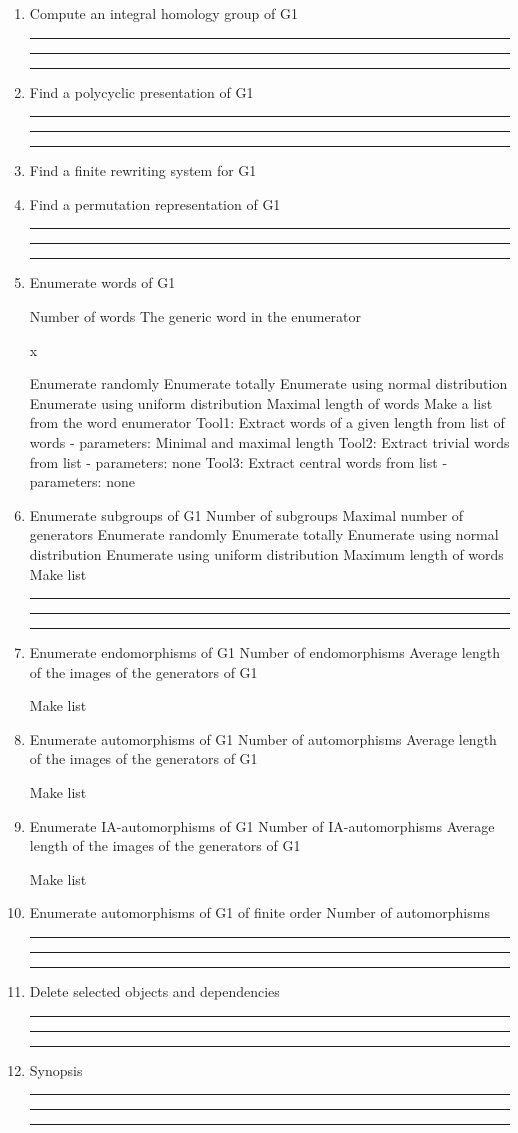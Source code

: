 \begin{enumerate}
\item Compute an integral homology group of G1

\bigskip
\hrule\hrule\hrule

\item Find a polycyclic presentation of G1

\bigskip
\hrule\hrule\hrule

\item Find a finite rewriting system for G1

\item Find a permutation representation of G1

\bigskip
\hrule\hrule\hrule
\item Enumerate words of G1

\subitem Number of words
\subsubitem The generic word in the enumerator

\hskip 2.0in    x

\subsubitem Enumerate randomly
\subsubitem Enumerate totally
\subsubitem Enumerate using normal distribution
\subsubitem Enumerate using uniform distribution
\subsubitem Maximal length of words
\bigskip
\subitem Make a list from the word enumerator
\subsubitem Tool1: Extract words of a given length
from list of words - parameters: Minimal and maximal length
\subsubitem Tool2: Extract trivial words from list - parameters: none
\subsubitem Tool3: Extract central words from list - parameters: none
\bigskip
\item Enumerate subgroups of G1
\subitem Number of subgroups
\subitem Maximal number of generators
\subsubitem Enumerate randomly
\subsubitem Enumerate totally
\subsubitem Enumerate using normal distribution
\subsubitem Enumerate using uniform distribution
\subsubitem Maximum length of words
\bigskip
\subitem Make list

\bigskip
\hrule\hrule\hrule

\bigskip
\item Enumerate endomorphisms of G1
\subitem Number of endomorphisms
\subsubitem Average length of the images of the generators of G1

\bigskip
\subitem Make list

\bigskip
\item Enumerate automorphisms of G1
\subitem Number of automorphisms
\subsubitem Average length of the images of the generators of G1

\bigskip
\subitem Make list

\bigskip
\item Enumerate IA-automorphisms of G1
\subitem Number of IA-automorphisms
\subsubitem Average length of the images of the generators of G1

\bigskip
\subitem Make list

\bigskip
\item Enumerate automorphisms of G1 of finite order
\subitem Number of automorphisms

\bigskip
\hrule\hrule\hrule

\item Delete selected objects and dependencies

\bigskip
\hrule\hrule\hrule

\item
Synopsis

\bigskip
\hrule\hrule\hrule

\end{enumerate}
